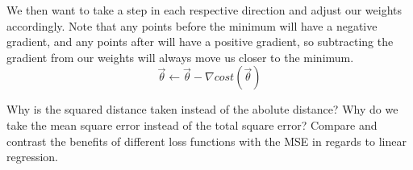 
We then want to take a step in each respective direction and adjust our weights accordingly. Note that any points before the minimum will have a negative gradient, and any points after will have a positive gradient, so subtracting the gradient from our weights will always move us closer to the minimum.
\begin{equation}
\vec\theta \leftarrow \vec\theta - \nabla cost(\vec\theta)
\end{equation}



\begin{exercise}
    \ex Why is the squared distance taken instead of the abolute distance?
    \ex Why do we take the mean square error instead of the total square error?
    \ex Compare and contrast the benefits of different loss functions with the
    MSE in regards to linear regression.
\end{exercise}
